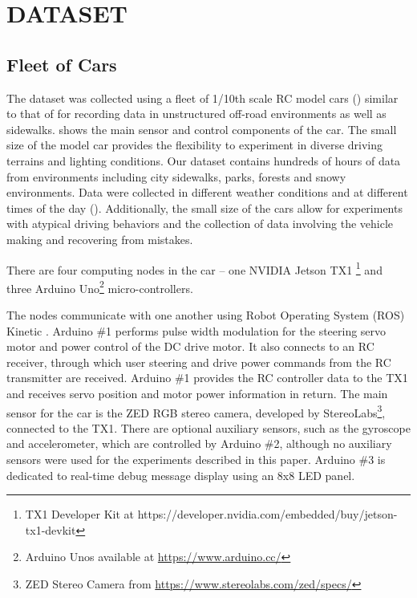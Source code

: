 \section{DATASET}
\label{sec:dataset}

\subsection{Fleet of Cars}
The dataset was collected using a fleet of 1/10th scale RC model cars () similar to that of \cite{intel_paper, williams2017information, giusti2016machine} for recording data in unstructured off-road environments as well as sidewalks.  shows the main sensor and control components of the car. The small size of the model car provides the flexibility to experiment in diverse driving terrains and lighting conditions. Our dataset contains hundreds of hours of data from environments including city sidewalks, parks, forests and snowy environments. Data were collected in different weather conditions and at different times of the day (). Additionally, the small size of the cars allow for experiments with atypical driving behaviors and the collection of data involving the vehicle making and recovering from mistakes.

There are four computing nodes in the car -- one NVIDIA Jetson TX1 \footnote{ TX1 Developer Kit at https://developer.nvidia.com/embedded/buy/jetson-tx1-devkit} and three Arduino Uno\footnote{Arduino Unos available at \url{https://www.arduino.cc/}} micro-controllers.

The nodes communicate with one another using Robot Operating System (ROS) Kinetic \cite{quigley2009ros}. Arduino \#1 performs pulse width modulation for the steering servo motor and power control of the DC drive motor. It also connects to an RC receiver, through which user steering and drive power commands from the RC transmitter are received. Arduino \#1 provides the RC controller data to the TX1 and receives servo position and motor power information in return. The main sensor for the car is the ZED RGB stereo camera, developed by StereoLabs\footnote{ ZED Stereo Camera from \url{https://www.stereolabs.com/zed/specs/}}, connected to the TX1. There are optional auxiliary sensors, such as the gyroscope and accelerometer, which are controlled by Arduino \#2, although no auxiliary sensors were used for the experiments described in this paper. Arduino \#3 is dedicated to real-time debug message display using an 8x8 LED panel. 

